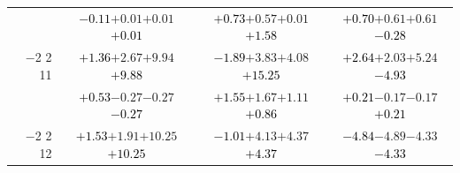 \documentclass[compress]{beamer}
\begin{document}
\begin{frame}
\begin{tabular}{r | c | c | c}
          & \textcolor{black}{$-0.11$}\hspace{0.1 cm}$+0.01$\hspace{0.1 cm}$+0.01$\hspace{0.1 cm}\textcolor{black}{$+0.01$} & \textcolor{black}{$+0.73$}\hspace{0.1 cm}$+0.57$\hspace{0.1 cm}$+0.01$\hspace{0.1 cm}\textcolor{black}{$+1.58$} & \textcolor{black}{$+0.70$}\hspace{0.1 cm}$+0.61$\hspace{0.1 cm}$+0.61$\hspace{0.1 cm}\textcolor{black}{$-0.28$} \\
$-$2 2 11 & \textcolor{black}{$+1.36$}\hspace{0.1 cm}$+2.67$\hspace{0.1 cm}$+9.94$\hspace{0.1 cm}\textcolor{black}{$+9.88$} & \textcolor{black}{$-1.89$}\hspace{0.1 cm}$+3.83$\hspace{0.1 cm}$+4.08$\hspace{0.1 cm}\textcolor{black}{$+15.25$} & \textcolor{black}{$+2.64$}\hspace{0.1 cm}$+2.03$\hspace{0.1 cm}$+5.24$\hspace{0.1 cm}\textcolor{black}{$-4.93$} \\
          & \textcolor{black}{$+0.53$}\hspace{0.1 cm}$-0.27$\hspace{0.1 cm}$-0.27$\hspace{0.1 cm}\textcolor{black}{$-0.27$} & \textcolor{black}{$+1.55$}\hspace{0.1 cm}$+1.67$\hspace{0.1 cm}$+1.11$\hspace{0.1 cm}\textcolor{black}{$+0.86$} & \textcolor{black}{$+0.21$}\hspace{0.1 cm}$-0.17$\hspace{0.1 cm}$-0.17$\hspace{0.1 cm}\textcolor{black}{$+0.21$} \\
$-$2 2 12 & \textcolor{black}{$+1.53$}\hspace{0.1 cm}$+1.91$\hspace{0.1 cm}$+10.25$\hspace{0.1 cm}\textcolor{black}{$+10.25$} & \textcolor{black}{$-1.01$}\hspace{0.1 cm}$+4.13$\hspace{0.1 cm}$+4.37$\hspace{0.1 cm}\textcolor{black}{$+4.37$} & \textcolor{black}{$-4.84$}\hspace{0.1 cm}$-4.89$\hspace{0.1 cm}$-4.33$\hspace{0.1 cm}\textcolor{black}{$-4.33$} \\

\end{tabular}
\end{frame}
\end{document}
